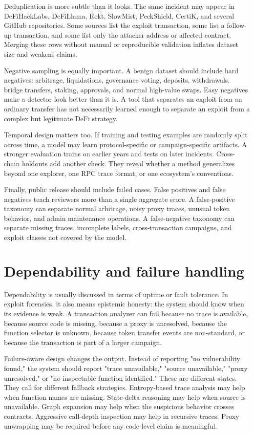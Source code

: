 \documentclass[conference]{IEEEtran}
\begin{document}
Deduplication is more subtle than it looks. The same incident may appear in DeFiHackLabs, DeFiLlama, Rekt, SlowMist, PeckShield, CertiK, and several GitHub repositories. Some sources list the exploit transaction, some list a follow-up transaction, and some list only the attacker address or affected contract. Merging these rows without manual or reproducible validation inflates dataset size and weakens claims.

Negative sampling is equally important. A benign dataset should include hard negatives: arbitrage, liquidations, governance voting, deposits, withdrawals, bridge transfers, staking, approvals, and normal high-value swaps. Easy negatives make a detector look better than it is. A tool that separates an exploit from an ordinary transfer has not necessarily learned enough to separate an exploit from a complex but legitimate DeFi strategy.

Temporal design matters too. If training and testing examples are randomly split across time, a model may learn protocol-specific or campaign-specific artifacts. A stronger evaluation trains on earlier years and tests on later incidents. Cross-chain holdouts add another check. They reveal whether a method generalizes beyond one explorer, one RPC trace format, or one ecosystem's conventions.

Finally, public release should include failed cases. False positives and false negatives teach reviewers more than a single aggregate score. A false-positive taxonomy can separate normal arbitrage, noisy proxy traces, unusual token behavior, and admin maintenance operations. A false-negative taxonomy can separate missing traces, incomplete labels, cross-transaction campaigns, and exploit classes not covered by the model.

\section{Dependability and failure handling}

Dependability is usually discussed in terms of uptime or fault tolerance. In exploit forensics, it also means epistemic honesty: the system should know when its evidence is weak. A transaction analyzer can fail because no trace is available, because source code is missing, because a proxy is unresolved, because the function selector is unknown, because token transfer events are non-standard, or because the transaction is part of a larger campaign.

Failure-aware design changes the output. Instead of reporting "no vulnerability found," the system should report "trace unavailable," "source unavailable," "proxy unresolved," or "no inspectable function identified." These are different states. They call for different fallback strategies. Entropy-based trace analysis may help when function names are missing. State-delta reasoning may help when source is unavailable. Graph expansion may help when the suspicious behavior crosses contracts. Aggressive call-depth inspection may help in recursive traces. Proxy unwrapping may be required before any code-level claim is meaningful.
\end{document}
